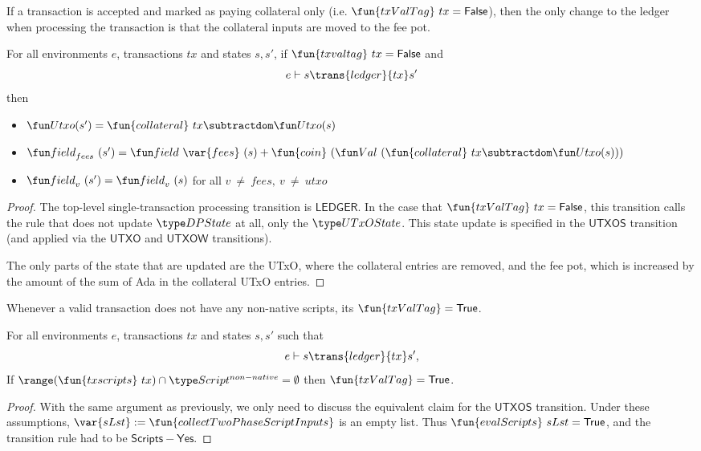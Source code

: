 \begin{property}
  \label{prop:fees-only}
  If a transaction is accepted and marked as paying collateral only
  (i.e. $\fun{txValTag}~tx = \False$), then the only change to the ledger
  when processing the transaction is that the collateral inputs
  are moved to the fee pot.

  \begin{lemma}
    For all environments $e$, transactions $tx$ and states $s, s'$, if $\fun{txvaltag}~tx = \False$ and
    \begin{equation*}
      e\vdash s\trans{ledger}{tx}s'
    \end{equation*}
    then
    \begin{itemize}
      \item $\Utxo(s') = \fun{collateral}~{tx} \subtractdom \Utxo(s)$
      \item $\field_{fees}~(s') = \field~\var{fees}~(s) + \fun{coin}~(\Val~(\fun{collateral}~{tx} \subtractdom \Utxo(s)))$
      \item $\field_{v}~(s') = \field_{v}~(s)$ for all $v~\neq~{fees}, ~v~\neq~{utxo}$
    \end{itemize}
  \end{lemma}

  \begin{proof}
  The top-level single-transaction processing transition is $\mathsf{LEDGER}$.
   In the case that $\fun{txValTag}~tx = \False$, this transition calls the rule
   that does not update $\DPState$ at all, only the $\UTxOState$. This state update is specified
   in the $\mathsf{UTXOS}$ transition (and applied via the $\mathsf{UTXO}$ and $\mathsf{UTXOW}$ transitions).

   The only parts of the state that are updated are the UTxO, where the collateral entries
   are removed, and the fee pot, which is increased by the amount of the sum of Ada in the
   collateral UTxO entries.
  \end{proof}
\end {property}

\begin{property}
  \label{prop:is-valid}

Whenever a valid transaction does not have any non-native scripts, its
$\fun{txValTag} = \True$.

\begin{lemma}
  For all environments $e$, transactions $tx$ and states $s, s'$ such that
  \begin{equation*}
    e\vdash s\trans{ledger}{tx}s',
  \end{equation*}
  If $\range (\fun{txscripts}~tx) \cap \ScriptNonNative = \emptyset$
  then $\fun{txValTag} = \True$.
\end{lemma}
\begin{proof}
  With the same argument as previously, we only need to discuss the
  equivalent claim for the $\mathsf{UTXOS}$ transition. Under these
  assumptions, $\var{sLst} := \fun{collectTwoPhaseScriptInputs}$ is an empty
  list. Thus $\fun{evalScripts}~sLst = \True$, and the transition rule
  had to be $\mathsf{Scripts{-}Yes}$.
\end{proof}
\end{property}

